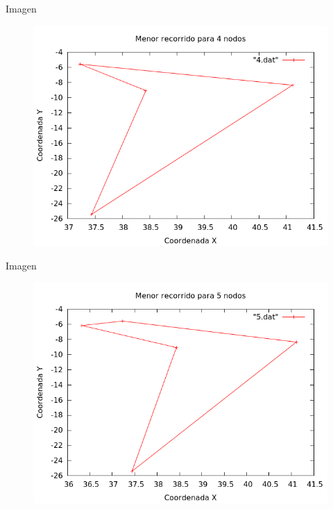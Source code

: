\begin{frame}
	\begin{exampleblock}{Imagen}
	\begin{figure}[H]
    	\centering
    	\includegraphics[scale=0.35]{../TSP/Graficas/4.png}
	\end{figure}
	\end{exampleblock}
\end{frame}

\begin{frame}
	\begin{exampleblock}{Imagen}
	\begin{figure}[H]
    \centering
    \includegraphics[scale=0.35]{../TSP/Graficas/5.png}
	\end{figure}
	\end{exampleblock}
\end{frame}


